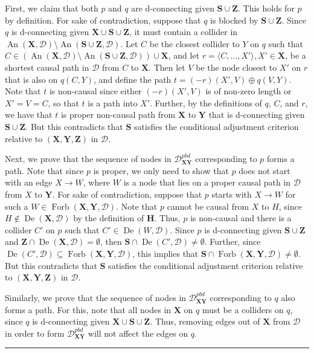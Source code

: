 \documentclass[twoside]{article}
\DeclareMathOperator{\An}{An}
\DeclareMathOperator{\De}{De}
\DeclareMathOperator{\Forb}{Forb}
\newcommand{\fb}[2][X,Y]{\Forb(\mb{#1},#2)}
\newcommand{\gpbd}[2][G]{\mathcal{#1}_{\mb{#2}}^{pbd}}
\newcommand{\mb}[1]{\mathbf{#1}}
\newcommand{\g}[1][G]{\mathcal{#1}}
\newenvironment{proofof}[1][]{\begin{trivlist}
\item[\hskip \labelsep {\bfseries Proof of #1.}]}{\hfill\BlackBox\end{trivlist}}
\newcommand{\BlackBox}{\rule{1.5ex}{1.5ex}}
\begin{document}
\begin{proofof}[Lemma \ref{lem:sound-setup1}]
    First, we claim that both $p$ and $q$ are d-connecting given $\mb{S} \cup \mb{Z}$. This holds for $p$ by definition. For sake of contradiction, suppose that $q$ is blocked by $\mb{S} \cup \mb{Z}$. Since $q$ is d-connecting given $\mb{X} \cup \mb{S} \cup \mb{Z}$, it must contain a collider in $\An(\mb{X},\g[D]) \setminus \An(\mb{S} \cup \mb{Z},\g[D])$. Let $C$ be the closest collider to $Y$ on $q$ such that $C \in (\An(\mb{X},\g[D]) \setminus \An(\mb{S} \cup \mb{Z},\g[D])) \cup \mb{X}$, and let $r=\langle C,\ldots,X' \rangle, X' \in \mb{X}$, be a shortest causal path in $\g[D]$ from $C$ to $\mb{X}$. Then let $V$ be the node closest to $X'$ on $r$ that is also on $q(C,Y)$, and define the path $t=(-r)(X',V) \oplus q(V,Y)$. Note that $t$ is non-causal since either $(-r)(X',V)$ is of non-zero length or $X'=V=C$, so that $t$ is a path into $X'$. Further, by the definitions of $q$, $C$, and $r$, we have that $t$ is proper non-causal path from $\mb{X}$ to $\mb{Y}$ that is d-connecting given $\mb{S} \cup \mb{Z}$. But this contradicts that $\mb{S}$ satisfies the conditional adjustment criterion relative to $(\mb{X,Y,Z})$ in $\g[D]$.

    Next, we prove that the sequence of nodes in $\gpbd[D]{XY}$ corresponding to $p$ forms a path. Note that since $p$ is proper, we only need to show that $p$ does not start with an edge $X \rightarrow W$, where $W$ is a node that lies on a proper causal path  in $\g[D]$ from $X$ to $\mb{Y}$. For sake of contradiction, suppose that $p$ starts with $X \rightarrow W$ for such a $W \in \fb{\g[D]}$. Note that $p$ cannot be causal from $X$ to $H$, since $H \notin \De(\mb{X},\g[D])$ by the definition of $\mb{H}$. Thus, $p$ is non-causal and there is a collider $C'$ on $p$ such that $C' \in \De(W,\g[D])$. Since $p$ is d-connecting given $\mb{S} \cup \mb{Z}$ and $\mb{Z} \cap \De(\mb{X}, \g[D]) = \emptyset$, then $\mb{S} \cap \De(C',\g[D]) \neq \emptyset$. Further, since $\De(C',\g[D]) \subseteq \fb{\g[D]}$, this implies that $\mb{S} \cap \fb{\g[D]} \neq \emptyset$. But this contradicts that $\mb{S}$ satisfies the conditional adjustment criterion relative to $(\mb{X,Y,Z})$ in $\g[D]$.

    Similarly, we prove that the sequence of nodes in $\gpbd[D]{XY}$ corresponding to $q$ also forms a path. For this, note that all nodes in $\mb{X}$ on $q$ must be a colliders on $q$, since $q$ is d-connecting given $\mb{X} \cup \mb{S} \cup \mb{Z}$. Thus, removing edges out of $\mb{X}$ from $\g[D]$ in order to form $\gpbd[D]{XY}$ will not affect the edges on $q$.


\end{proofof}
\end{document}
